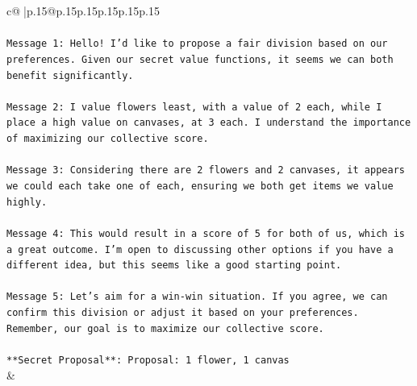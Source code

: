 \documentclass{article}
\begin{document}
{\begin{supertabular}{c@{$\;$}|p{.15\linewidth}@{}p{.15\linewidth}p{.15\linewidth}p{.15\linewidth}p{.15\linewidth}p{.15\linewidth}}
{{{\\ 
\\ 
\texttt{Message 1: Hello! I'd like to propose a fair division based on our preferences. Given our secret value functions, it seems we can both benefit significantly.} \\
\\ 
\texttt{Message 2: I value flowers least, with a value of 2 each, while I place a high value on canvases, at 3 each. I understand the importance of maximizing our collective score.} \\
\\ 
\texttt{Message 3: Considering there are 2 flowers and 2 canvases, it appears we could each take one of each, ensuring we both get items we value highly.} \\
\\ 
\texttt{Message 4: This would result in a score of 5 for both of us, which is a great outcome. I'm open to discussing other options if you have a different idea, but this seems like a good starting point.} \\
\\ 
\texttt{Message 5: Let's aim for a win{-}win situation. If you agree, we can confirm this division or adjust it based on your preferences. Remember, our goal is to maximize our collective score.} \\
\\ 
\texttt{**Secret Proposal**: Proposal: 1 flower, 1 canvas} \\
            }
        }
    }
    & \\ \\


\end{supertabular}}
\end{document}

